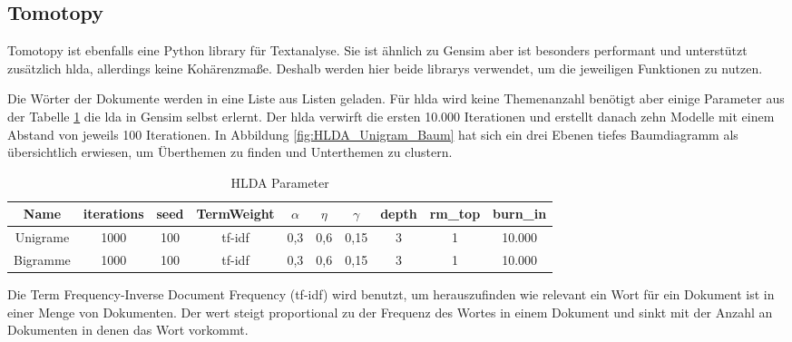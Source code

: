 \subsection{Tomotopy}
Tomotopy ist ebenfalls eine Python library für Textanalyse. Sie ist ähnlich zu Gensim aber ist besonders performant und unterstützt zusätzlich \ac{hlda}, allerdings keine Kohärenzmaße. Deshalb werden hier beide librarys verwendet, um die jeweiligen Funktionen zu nutzen.

Die Wörter der Dokumente werden in eine Liste aus Listen geladen. Für \ac{hlda} wird keine Themenanzahl benötigt aber einige Parameter aus der Tabelle \ref{table:HLDA_Parameter} die \ac{lda} in Gensim selbst erlernt. Der \ac{hlda} verwirft die ersten 10.000 Iterationen und erstellt danach zehn Modelle mit einem Abstand von jeweils 100 Iterationen. \parencite[vgl.][S. 6]{griffiths2004hierarchical}  In Abbildung \ref{fig:HLDA_Unigram_Baum} hat sich ein drei Ebenen tiefes Baumdiagramm als übersichtlich erwiesen, um Überthemen zu finden und Unterthemen zu clustern.

\begin{table}
	\centering
	\caption{HLDA Parameter}
	\begin{tabular}{|c|c|c|c|c|c|c|c|c|c|}
		\hline 
		Name& iterations & seed & TermWeight & $\alpha$ & $\eta$ & $\gamma$ & depth & rm\_top & burn\_in \\ 
		\hline 
		Unigrame& 1000 & 100 & \ac{tf-idf} & 0,3 & 0,6 & 0,15 & 3 & 1 & 10.000 \\ 
		\hline 
		Bigramme& 1000 & 100 & \ac{tf-idf} & 0,3 & 0,6 & 0,15 & 3 & 1 & 10.000  \\ 
		\hline  
	\end{tabular}
	\label{table:HLDA_Parameter}
\end{table} 

Die Term Frequency-Inverse Document Frequency (\ac{tf-idf}) wird benutzt, um herauszufinden wie relevant ein Wort für ein Dokument ist in einer Menge von Dokumenten. Der wert steigt proportional zu der Frequenz des Wortes in einem Dokument und sinkt mit der Anzahl an Dokumenten in denen das Wort vorkommt.

